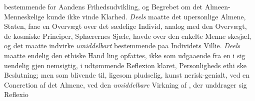 bestemmende for Aandens Frihedsudvikling, og Begrebet om
det Almeen-Menneskelige kunde ikke vinde Klarhed. \emph{Deels}
maatte det upersonlige Almene, Staten, faae en Overvægt over
det sædelige Individ, analog med den Overvægt, de kosmiske
Principer, Sphærernes Sjæle, havde over den enkelte Menne\-%
skesjæl, og det maatte indvirke \emph{umiddelbart} bestemmende
paa Individets Villie. \emph{Deels} maatte endelig den ethiske Hand\-%
ling opfattes, ikke som udgaaende fra en i sig uendelig gjen\-%
nemsigtig, i udtømmende Reflexion klaret, Personligheds ethi\-%
ske Beslutning; men som blivende til, ligesom pludselig, kunst\-%
nerisk-genialt, ved en Concretion af det Almene, ved den
\emph{umiddelbare} Virkning af , der unddrager sig Reflexio\-%

